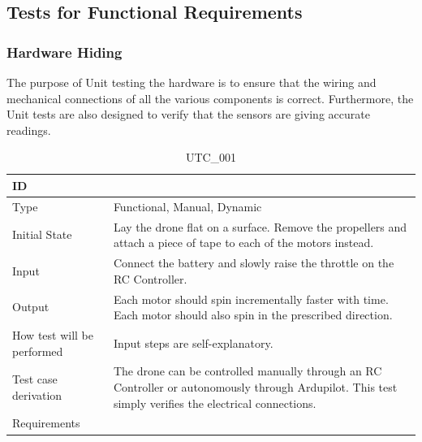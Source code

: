 \documentclass[12pt, titlepage]{article}
\begin{document}
\subsection{Tests for Functional Requirements}

\subsubsection{Hardware Hiding}

The purpose of Unit testing the hardware is to ensure that the wiring and mechanical connections of all the various components is correct. Furthermore, the Unit tests are also designed to verify that the sensors are giving accurate readings. 

\begin{table}[!h]
\begin{center}
\caption {UTC\_001}
\label{tab:UTC_001}
\begin{tabular}{ | m{3.2cm} | m{12.2cm} | } 
\hline
ID & \nameref{tab:UTC_001} \\ 
\hline
Type &  Functional, Manual, Dynamic  \\ 
\hline
Initial State & Lay the drone flat on a surface. Remove the propellers and attach a piece of tape to each of the motors instead.\\ 
\hline
Input & Connect the battery and slowly raise the throttle on the RC Controller.
 \\ 
\hline
Output &  Each motor should spin incrementally faster with time. Each motor should also spin in the prescribed direction. \\ 
\hline
How test will be performed & Input steps are self-explanatory. \\ 
\hline
Test case derivation & The drone can be controlled manually through an RC Controller or autonomously through Ardupilot. This test simply verifies the electrical connections.   \\ 
\hline
Requirements &  \\ 
\hline
\end{tabular}
\end{center}
\end{table}
\end{document}
